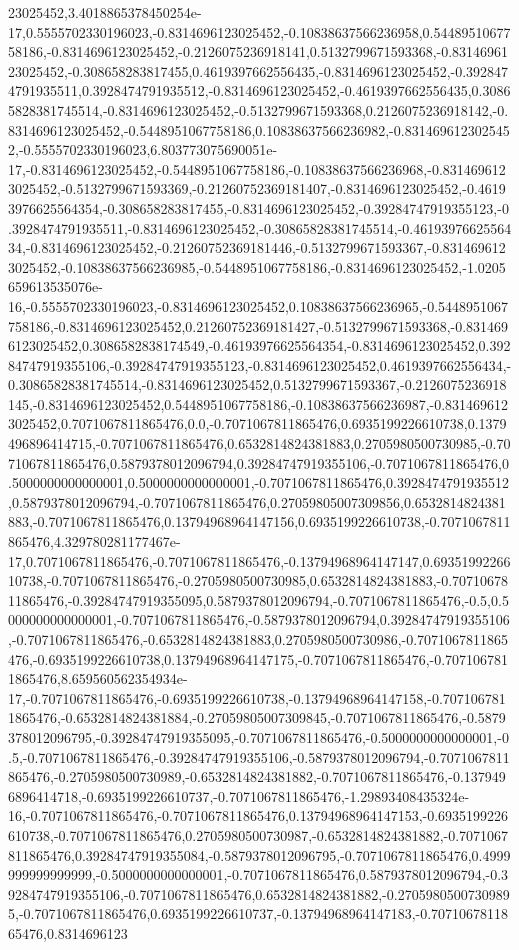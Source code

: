 23025452,3.4018865378450254e-17,0.5555702330196023,-0.8314696123025452,-0.10838637566236958,0.5448951067758186,-0.8314696123025452,-0.2126075236918141,0.5132799671593368,-0.8314696123025452,-0.308658283817455,0.4619397662556435,-0.8314696123025452,-0.3928474791935511,0.3928474791935512,-0.8314696123025452,-0.4619397662556435,0.30865828381745514,-0.8314696123025452,-0.5132799671593368,0.2126075236918142,-0.8314696123025452,-0.5448951067758186,0.10838637566236982,-0.8314696123025452,-0.5555702330196023,6.803773075690051e-17,-0.8314696123025452,-0.5448951067758186,-0.10838637566236968,-0.8314696123025452,-0.5132799671593369,-0.21260752369181407,-0.8314696123025452,-0.46193976625564354,-0.308658283817455,-0.8314696123025452,-0.39284747919355123,-0.3928474791935511,-0.8314696123025452,-0.30865828381745514,-0.4619397662556434,-0.8314696123025452,-0.21260752369181446,-0.5132799671593367,-0.8314696123025452,-0.10838637566236985,-0.5448951067758186,-0.8314696123025452,-1.0205659613535076e-16,-0.5555702330196023,-0.8314696123025452,0.10838637566236965,-0.5448951067758186,-0.8314696123025452,0.21260752369181427,-0.5132799671593368,-0.8314696123025452,0.3086582838174549,-0.46193976625564354,-0.8314696123025452,0.39284747919355106,-0.39284747919355123,-0.8314696123025452,0.4619397662556434,-0.30865828381745514,-0.8314696123025452,0.5132799671593367,-0.2126075236918145,-0.8314696123025452,0.5448951067758186,-0.10838637566236987,-0.8314696123025452,0.7071067811865476,0.0,-0.7071067811865476,0.6935199226610738,0.1379496896414715,-0.7071067811865476,0.6532814824381883,0.2705980500730985,-0.7071067811865476,0.5879378012096794,0.39284747919355106,-0.7071067811865476,0.5000000000000001,0.5000000000000001,-0.7071067811865476,0.3928474791935512,0.5879378012096794,-0.7071067811865476,0.27059805007309856,0.6532814824381883,-0.7071067811865476,0.13794968964147156,0.6935199226610738,-0.7071067811865476,4.329780281177467e-17,0.7071067811865476,-0.7071067811865476,-0.13794968964147147,0.6935199226610738,-0.7071067811865476,-0.2705980500730985,0.6532814824381883,-0.7071067811865476,-0.39284747919355095,0.5879378012096794,-0.7071067811865476,-0.5,0.5000000000000001,-0.7071067811865476,-0.5879378012096794,0.39284747919355106,-0.7071067811865476,-0.6532814824381883,0.2705980500730986,-0.7071067811865476,-0.6935199226610738,0.13794968964147175,-0.7071067811865476,-0.7071067811865476,8.659560562354934e-17,-0.7071067811865476,-0.6935199226610738,-0.13794968964147158,-0.7071067811865476,-0.6532814824381884,-0.27059805007309845,-0.7071067811865476,-0.5879378012096795,-0.39284747919355095,-0.7071067811865476,-0.5000000000000001,-0.5,-0.7071067811865476,-0.39284747919355106,-0.5879378012096794,-0.7071067811865476,-0.2705980500730989,-0.6532814824381882,-0.7071067811865476,-0.1379496896414718,-0.6935199226610737,-0.7071067811865476,-1.29893408435324e-16,-0.7071067811865476,-0.7071067811865476,0.13794968964147153,-0.6935199226610738,-0.7071067811865476,0.2705980500730987,-0.6532814824381882,-0.7071067811865476,0.39284747919355084,-0.5879378012096795,-0.7071067811865476,0.4999999999999999,-0.5000000000000001,-0.7071067811865476,0.5879378012096794,-0.39284747919355106,-0.7071067811865476,0.6532814824381882,-0.27059805007309895,-0.7071067811865476,0.6935199226610737,-0.13794968964147183,-0.7071067811865476,0.8314696123